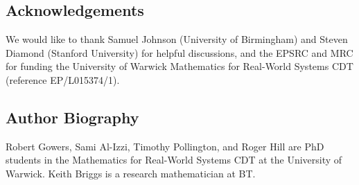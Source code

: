 \documentclass[twocolumn,secnumarabic,amssymb, nobibnotes, aps, prl,superscriptaddress]{revtex4-1}
\begin{document}
\subsection*{Acknowledgements}
\noindent{}We would like to thank Samuel Johnson (University of Birmingham) and Steven Diamond (Stanford University) for helpful discussions, and the EPSRC and MRC for funding the University of Warwick Mathematics for Real-World Systems CDT (reference EP/L015374/1).

\subsection*{Author Biography}
\noindent{}Robert Gowers, Sami Al-Izzi, Timothy Pollington, and Roger Hill are PhD students in the Mathematics for Real-World Systems CDT at the University of Warwick.  Keith Briggs is a research mathematician at BT.

\vspace{0.2cm}

 


\end{document}
